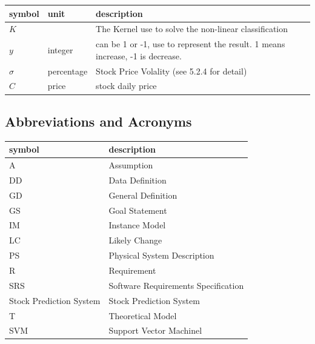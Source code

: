 \documentclass[12pt]{article}
\newcommand{\progname}{Stock Prediction System} %
\begin{document}
\renewcommand{\arraystretch}{1.2}
\noindent \begin{longtable*}{l l p{12cm}} \toprule
\textbf{symbol} & \textbf{unit} & \textbf{description}\\
\midrule 
$K$ & \si[per-mode=symbol] {} & The Kernel use to solve the non-linear classification\\
$y$ & \si[per-mode=symbol] {integer} & can be 1 or -1, use to represent the result. 1 means increase, -1 is decrease.\\
$\sigma$ & \si[per-mode=symbol] {percentage} & Stock Price Volality (see 5.2.4 for detail)\\ 
$C$ & \si[per-mode=symbol] {price} & stock daily price\\ 
\bottomrule
\end{longtable*}


\subsection{Abbreviations and Acronyms}

\renewcommand{\arraystretch}{1.2}
\begin{tabular}{l l} 
  \toprule		
  \textbf{symbol} & \textbf{description}\\
  \midrule 
  A & Assumption\\
  DD & Data Definition\\
  GD & General Definition\\
  GS & Goal Statement\\
  IM & Instance Model\\
  LC & Likely Change\\
  PS & Physical System Description\\
  R & Requirement\\
  SRS & Software Requirements Specification\\
  \progname{} & {Stock Prediction System}\\
  T & Theoretical Model\\
  SVM & Support Vector Machinel\\
  \bottomrule
\end{tabular}\\


\newpage

\tableofcontents

~\newpage

\end{document}
